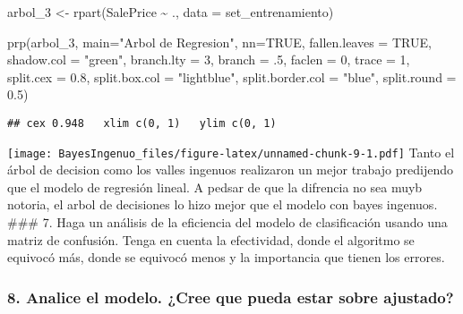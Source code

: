 \documentclass[
]{article}
\newenvironment{Shaded}{\begin{snugshade}}{\end{snugshade}}
\newcommand{\AttributeTok}[1]{\textcolor[rgb]{0.77,0.63,0.00}{#1}}
\newcommand{\CommentTok}[1]{\textcolor[rgb]{0.56,0.35,0.01}{\textit{#1}}}
\newcommand{\ConstantTok}[1]{\textcolor[rgb]{0.00,0.00,0.00}{#1}}
\newcommand{\DecValTok}[1]{\textcolor[rgb]{0.00,0.00,0.81}{#1}}
\newcommand{\FloatTok}[1]{\textcolor[rgb]{0.00,0.00,0.81}{#1}}
\newcommand{\FunctionTok}[1]{\textcolor[rgb]{0.00,0.00,0.00}{#1}}
\newcommand{\NormalTok}[1]{#1}
\newcommand{\OtherTok}[1]{\textcolor[rgb]{0.56,0.35,0.01}{#1}}
\newcommand{\SpecialCharTok}[1]{\textcolor[rgb]{0.00,0.00,0.00}{#1}}
\newcommand{\StringTok}[1]{\textcolor[rgb]{0.31,0.60,0.02}{#1}}
\begin{document}
\begin{Shaded}
\begin{Highlighting}[]
\NormalTok{arbol\_3 }\OtherTok{\textless{}{-}} \FunctionTok{rpart}\NormalTok{(SalePrice }\SpecialCharTok{\textasciitilde{}}\NormalTok{ ., }\AttributeTok{data =}\NormalTok{ set\_entrenamiento)}

\FunctionTok{prp}\NormalTok{(arbol\_3, }\AttributeTok{main=}\StringTok{"Arbol de Regresion"}\NormalTok{, }\AttributeTok{nn=}\ConstantTok{TRUE}\NormalTok{, }\AttributeTok{fallen.leaves =} \ConstantTok{TRUE}\NormalTok{, }\AttributeTok{shadow.col =} \StringTok{"green"}\NormalTok{, }\AttributeTok{branch.lty =} \DecValTok{3}\NormalTok{, }\AttributeTok{branch =}\NormalTok{ .}\DecValTok{5}\NormalTok{, }\AttributeTok{faclen =} \DecValTok{0}\NormalTok{, }\AttributeTok{trace =} \DecValTok{1}\NormalTok{, }\AttributeTok{split.cex =} \FloatTok{0.8}\NormalTok{, }\AttributeTok{split.box.col =} \StringTok{"lightblue"}\NormalTok{, }\AttributeTok{split.border.col =} \StringTok{"blue"}\NormalTok{, }\AttributeTok{split.round =} \FloatTok{0.5}\NormalTok{)}
\end{Highlighting}
\end{Shaded}

\begin{verbatim}
## cex 0.948   xlim c(0, 1)   ylim c(0, 1)
\end{verbatim}

\texttt{[image: BayesIngenuo\_files/figure-latex/unnamed-chunk-9-1.pdf]}
Tanto el árbol de decision como los valles ingenuos realizaron un mejor
trabajo predijendo que el modelo de regresión lineal. A pedsar de que la
difrencia no sea muyb notoria, el arbol de decisiones lo hizo mejor que
el modelo con bayes ingenuos. \#\#\# 7. Haga un análisis de la
eficiencia del modelo de clasificación usando una matriz de confusión.
Tenga en cuenta la efectividad, donde el algoritmo se equivocó más,
donde se equivocó menos y la importancia que tienen los errores.

\begin{Shaded}
\end{Shaded}

\hypertarget{analice-el-modelo.-cree-que-pueda-estar-sobre-ajustado}{%
\subsubsection{8. Analice el modelo. ¿Cree que pueda estar sobre
ajustado?}\label{analice-el-modelo.-cree-que-pueda-estar-sobre-ajustado}}
\end{document}
